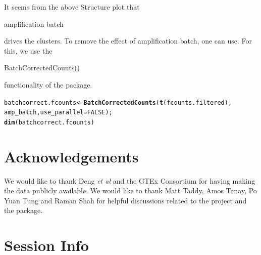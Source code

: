 \documentclass[12pt]{article}\usepackage[]{graphicx}\usepackage[usenames,dvipsnames]{color}
\makeatletter
\newcommand{\hlnum}[1]{\textcolor[rgb]{0.686,0.059,0.569}{#1}}%
\newcommand{\hlstd}[1]{\textcolor[rgb]{0.345,0.345,0.345}{#1}}%
\newcommand{\hlkwb}[1]{\textcolor[rgb]{0.69,0.353,0.396}{#1}}%
\newcommand{\hlkwc}[1]{\textcolor[rgb]{0.333,0.667,0.333}{#1}}%
\newcommand{\hlkwd}[1]{\textcolor[rgb]{0.737,0.353,0.396}{\textbf{#1}}}%
\newenvironment{kframe}{%
 \def\at@end@of@kframe{}%
 \ifinner\ifhmode%
  \def\at@end@of@kframe{\end{minipage}}%
  \begin{minipage}{\columnwidth}%
 \fi\fi%
 \def\FrameCommand##1{\hskip\@totalleftmargin \hskip-\fboxsep
 \colorbox{shadecolor}{##1}\hskip-\fboxsep
     \hskip-\linewidth \hskip-\@totalleftmargin \hskip\columnwidth}%
 \MakeFramed {\advance\hsize-\width
   \@totalleftmargin\z@ \linewidth\hsize
   \@setminipage}}%
 {\par\unskip\endMakeFramed%
 \at@end@of@kframe}
\newenvironment{knitrout}{}{} %
\makeatother
\begin{document}
It seems from the above Structure plot that \begin{verb} amplification batch \end{verb} drives the clusters. To remove the effect of amplification batch, one can use. For this, we use the \begin{verb} BatchCorrectedCounts() \end{verb} functionality of the package.

\clearpage

\begin{knitrout}
\color{fgcolor}\begin{kframe}
\begin{alltt}
\hlstd{batchcorrect.fcounts} \hlkwb{<-} \hlkwd{BatchCorrectedCounts}\hlstd{(}\hlkwd{t}\hlstd{(fcounts.filtered),}
                                          \hlstd{amp_batch,} \hlkwc{use_parallel} \hlstd{=} \hlnum{FALSE}\hlstd{);}
\hlkwd{dim}\hlstd{(batchcorrect.fcounts)}
\end{alltt}
\end{kframe}
\end{knitrout}

\section{Acknowledgements}

We would like to thank Deng \textit{et al} and the GTEx Consortium for having making the data publicly available. We would like to thank Matt Taddy, Amos Tanay, Po Yuan Tung and Raman Shah for helpful discussions related to the project and the package.

\section{Session Info}
\end{document}
